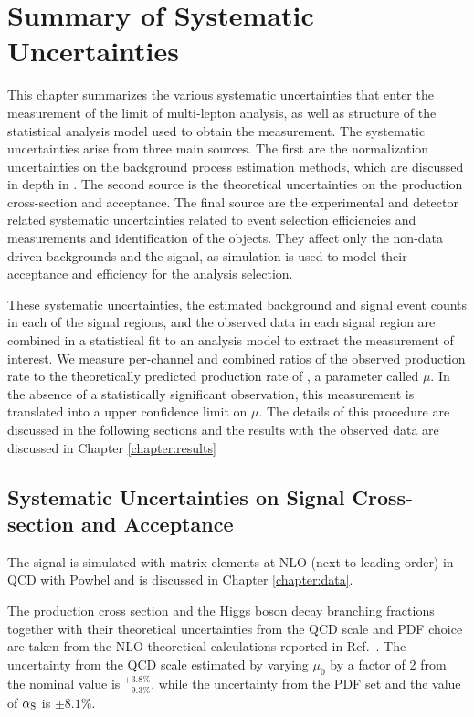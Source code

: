 \chapter[Summary of Systematic Uncertainties][Summary of Systematic Uncertainties]{Summary of Systematic Uncertainties}
\label{chapter:systematics} 

This chapter summarizes the various systematic uncertainties that enter the measurement of the limit of \tth multi-lepton analysis, as well as structure of the statistical 
analysis model used to obtain the measurement. The systematic uncertainties arise
from three main sources. The first are the normalization uncertainties on the background process estimation methods, which are discussed in depth in \label{chapter:backgrounds}. 
The second source is the theoretical uncertainties on the \tth production cross-section and acceptance. The final source are the experimental and detector related systematic
uncertainties related to event selection efficiencies and measurements and identification of the objects. They affect only the non-data driven backgrounds and the \tth
signal, as simulation is used to model their acceptance and efficiency for the analysis selection. 

These systematic uncertainties, the estimated background and signal event counts in each of the signal regions, and the observed data in each signal region are combined
in a statistical fit to an analysis model to extract the measurement of interest. We measure per-channel and combined ratios of the observed production rate to the 
theoretically predicted production rate of \tth, a parameter called $\mu$. In the absence of a statistically significant observation, this measurement is translated into a upper confidence limit
on $\mu$. The details of this procedure are discussed in the following sections and the results with the observed data are discussed in Chapter \ref{chapter:results}

\section{Systematic Uncertainties on Signal Cross-section and Acceptance}
\label{section:tth}
The \tth signal is simulated with matrix elements at NLO (next-to-leading order) in QCD with {\textsc Powhel} and is discussed in Chapter \ref{chapter:data}.  

The production cross section and the Higgs boson decay branching fractions together with their theoretical uncertainties from the QCD scale and PDF choice are taken from the NLO theoretical calculations reported in Ref.~\cite{Heinemeyer:2013tqa}. The uncertainty from the QCD scale estimated by varying $\mu_{0}$ by a factor of 2 from the nominal value is $^{+3.8\%}_{-9.3\%}$, while the uncertainty from the PDF set and the value of $\alpha_{\rm S}$ is $\pm 8.1\%$.\\


